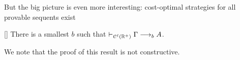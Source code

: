 But the big picture is even more interesting: cost-optimal strategies for all provable sequents exist
\begin{theorem}\label{cor:spectrum}[\cite{DBLP:conf/tableaux/LangOPF19}]
There is a smallest $b$ such that $\vdash_{\mathcal{C}^\ell(\mathbb{R}^+)}\Gamma\longrightarrow_b A$.
\end{theorem}
We note that the proof of this result is not constructive.



